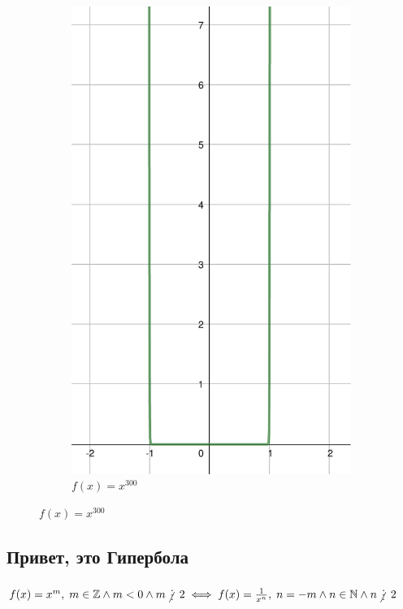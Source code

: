 \begin{figure}[h]
\begin{subfigure}{0.35\textwidth}
        \includegraphics[width=\textwidth]{tex/chapter_2/assets/y=x^300.pdf}
        \caption*{$f(x) = x^{300}$}
    \end{subfigure}
\end{figure}

\subsection{Привет, это Гипербола}

$f(x) = x^m, \; m \in \mathbb{Z} \land m < 0 \land m \notdivisible 2 \iff f(x) = \frac{1}{x^n}, \; n = -m \land n \in \mathbb{N} \land n \notdivisible 2$ \\

